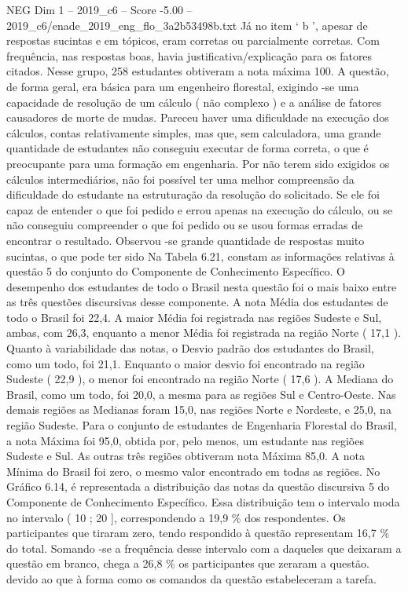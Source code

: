 \begin{textsample}{NEG Dim 1 – 2019\_c6 – Score -5.00 – 2019\_c6/enade\_2019\_eng\_flo\_3a2b53498b.txt}
Já no item ‘ b ’, apesar de respostas sucintas e em tópicos, eram corretas ou parcialmente corretas.
Com frequência, nas respostas boas, havia justificativa/explicação para os fatores citados.
Nesse grupo, 258 estudantes obtiveram a nota máxima 100.
A questão, de forma geral, era básica para um engenheiro florestal, exigindo -se uma capacidade de resolução de um cálculo ( não complexo ) e a análise de fatores causadores de morte de mudas.
Pareceu haver uma dificuldade na execução dos cálculos, contas relativamente simples, mas que, sem calculadora, uma grande quantidade de estudantes não conseguiu executar de forma correta, o que é preocupante para uma formação em engenharia.
Por não terem sido exigidos os cálculos intermediários, não foi possível ter uma melhor compreensão da dificuldade do estudante na estruturação da resolução do solicitado.
Se ele foi capaz de entender o que foi pedido e errou apenas na execução do cálculo, ou se não conseguiu compreender o que foi pedido ou se usou formas erradas de encontrar o resultado.
Observou -se grande quantidade de respostas muito sucintas, o que pode ter sido Na Tabela 6.21, constam as informações relativas à questão 5 do conjunto do Componente de Conhecimento Específico.
O desempenho dos estudantes de todo o Brasil nesta questão foi o mais baixo entre as três questões discursivas desse componente.
A nota Média dos estudantes de todo o Brasil foi 22,4.
A maior Média foi registrada nas regiões Sudeste e Sul, ambas, com 26,3, enquanto a menor Média foi registrada na região Norte ( 17,1 ).
Quanto à variabilidade das notas, o Desvio padrão dos estudantes do Brasil, como um todo, foi 21,1.
Enquanto o maior desvio foi encontrado na região Sudeste ( 22,9 ), o menor foi encontrado na região Norte ( 17,6 ).
A Mediana do Brasil, como um todo, foi 20,0, a mesma para as regiões Sul e Centro-Oeste.
Nas demais regiões as Medianas foram 15,0, nas regiões Norte e Nordeste, e 25,0, na região Sudeste.
Para o conjunto de estudantes de Engenharia Florestal do Brasil, a nota Máxima foi 95,0, obtida por, pelo menos, um estudante nas regiões Sudeste e Sul.
As outras três regiões obtiveram nota Máxima 85,0.
A nota Mínima do Brasil foi zero, o mesmo valor encontrado em todas as regiões.
No Gráfico 6.14, é representada a distribuição das notas da questão discursiva 5 do Componente de Conhecimento Específico.
Essa distribuição tem o intervalo moda no intervalo ( 10 ; 20 ], correspondendo a 19,9 \% dos respondentes.
Os participantes que tiraram zero, tendo respondido à questão representam 16,7 \% do total.
Somando -se a frequência desse intervalo com a daqueles que deixaram a questão em branco, chega a 26,8 \% os participantes que zeraram a questão. devido ao que à forma como os comandos da questão estabeleceram a tarefa.

\end{textsample}
